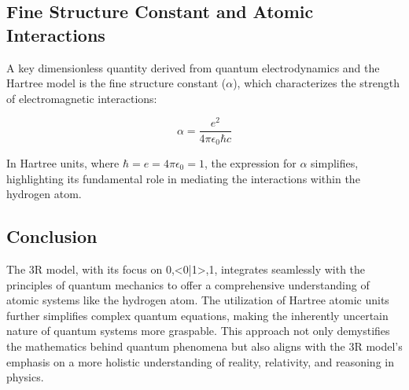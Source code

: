 \documentclass[12pt]{article}
\begin{document}
\subsection*{Fine Structure Constant and Atomic Interactions}

A key dimensionless quantity derived from quantum electrodynamics and the Hartree model is the fine structure constant ($\alpha$), which characterizes the strength of electromagnetic interactions:

\begin{equation}
    \alpha = \frac{e^2}{4\pi \epsilon_0 \hbar c}
\end{equation}

In Hartree units, where $\hbar = e = 4\pi\epsilon_0 = 1$, the expression for $\alpha$ simplifies, highlighting its fundamental role in mediating the interactions within the hydrogen atom.

\subsection*{Conclusion}

The 3R model, with its focus on {0,<0|1>,1}, integrates seamlessly with the principles of quantum mechanics to offer a comprehensive understanding of atomic systems like the hydrogen atom. The utilization of Hartree atomic units further simplifies complex quantum equations, making the inherently uncertain nature of quantum systems more graspable. This approach not only demystifies the mathematics behind quantum phenomena but also aligns with the 3R model's emphasis on a more holistic understanding of reality, relativity, and reasoning in physics.

\end{document}

